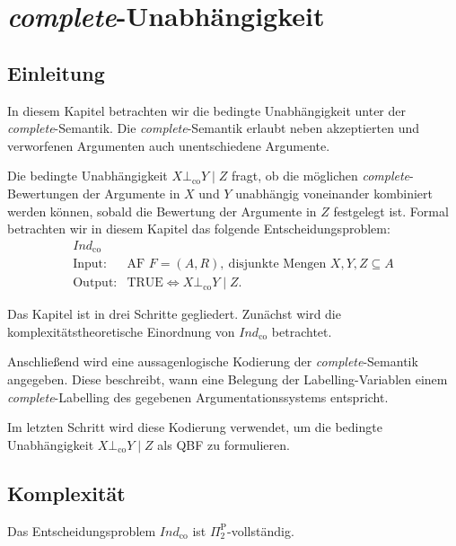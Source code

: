 \chapter{\textit{complete}-Unabhängigkeit}
\label{ch:complete}

\section{Einleitung}
\label{sec:co-ci-einleitung}
In diesem Kapitel betrachten wir die bedingte Unabhängigkeit unter der
\textit{complete}-Semantik. Die \textit{complete}-Semantik erlaubt
neben akzeptierten und verworfenen Argumenten auch unentschiedene Argumente.

Die bedingte Unabhängigkeit \(X \bot_{\mathrm{co}} Y \mid Z\)
fragt, ob die möglichen \textit{complete}-Bewertungen der Argumente in \(X\)
und \(Y\) unabhängig voneinander kombiniert werden können, sobald die Bewertung
der Argumente in \(Z\) festgelegt ist.
Formal betrachten wir in diesem Kapitel das folgende Entscheidungsproblem:
\[
\begin{array}{ll}
\textit{Ind}_{\mathrm{co}}\\
\text{Input:}  & \text{AF } F=(A,R),\ \text{disjunkte Mengen } X,Y,Z \subseteq A \\
\text{Output:} & \text{TRUE} \Longleftrightarrow X \bot_{\mathrm{co}} Y \mid Z.
\end{array}
\]

Das Kapitel ist in drei Schritte gegliedert. Zunächst wird die
komplexitätstheoretische Einordnung von \(\textit{Ind}_{\mathrm{co}}\)
betrachtet. 

Anschließend wird eine aussagenlogische Kodierung der
\textit{complete}-Semantik angegeben. Diese beschreibt, wann eine Belegung der
Labelling-Variablen einem \textit{complete}-Labelling des gegebenen
Argumentationssystems entspricht. 

Im letzten Schritt wird diese Kodierung
verwendet, um die bedingte Unabhängigkeit
\(X \bot_{\mathrm{co}} Y \mid Z\) als QBF zu formulieren.

\section{Komplexität}
\begin{Theorem}
    \label{th:ind-co-is-pi2p-c}
    Das Entscheidungsproblem \(\textit{Ind}_{\mathrm{co}}\) ist
    \(\Pi_2^\text{P}\)-vollständig.
\end{Theorem}

